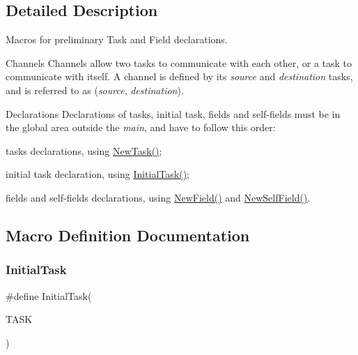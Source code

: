 \subsection{Detailed Description}
Macros for preliminary Task and Field declarations.

\begin{DoxyParagraph}{Channels}
Channels allow two tasks to communicate with each other, or a task to communicate with itself. A channel is defined by its {\itshape source} and {\itshape destination} tasks, and is referred to as ({\itshape source}, {\itshape destination}).
\end{DoxyParagraph}
\begin{DoxyParagraph}{Declarations}
Declarations of tasks, initial task, fields and self-\/fields must be in the global area outside the {\itshape main}, and have to follow this order\+: \begin{DoxyItemize}
\item tasks declarations, using {\ttfamily \hyperlink{group__interpow__declaration_gaf3547b2fb7ca0e0fe642e6b5cbdbdaf2}{New\+Task()}}; \item initial task declaration, using {\ttfamily \hyperlink{group__interpow__declaration_ga1156bffe7de2162c5889cf427dd30657}{Initial\+Task()}}; \item fields and self-\/fields declarations, using {\ttfamily \hyperlink{group__interpow__declaration_gafcc1282442066a75e573d78ae3b6dac1}{New\+Field()}} and {\ttfamily \hyperlink{group__interpow__declaration_ga224e55a4652c727d23a3301b314398bd}{New\+Self\+Field()}}. \end{DoxyItemize}

\end{DoxyParagraph}


\subsection{Macro Definition Documentation}
\mbox{\label{group__interpow__declaration_ga1156bffe7de2162c5889cf427dd30657}} 
\subsubsection{\texorpdfstring{Initial\+Task}{InitialTask}}
{\footnotesize\ttfamily \#define Initial\+Task(\begin{DoxyParamCaption}\item[{}]{T\+A\+SK }\end{DoxyParamCaption})}



